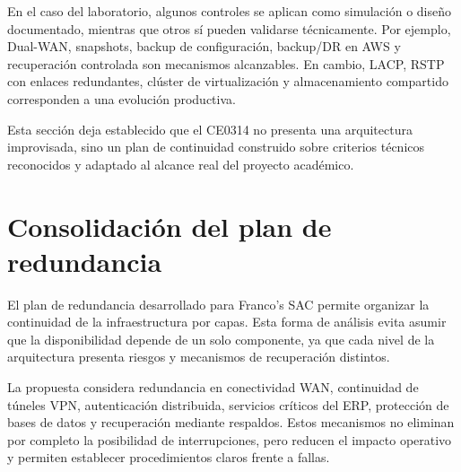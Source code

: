 \documentclass[11pt, a4paper, oneside]{report}
\begin{document}
En el caso del laboratorio, algunos controles se aplican como simulación o diseño documentado, mientras que otros sí pueden validarse técnicamente. Por ejemplo, Dual-WAN, snapshots, backup de configuración, backup/DR en AWS y recuperación controlada son mecanismos alcanzables. En cambio, LACP, RSTP con enlaces redundantes, clúster de virtualización y almacenamiento compartido corresponden a una evolución productiva.

Esta sección deja establecido que el CE0314 no presenta una arquitectura improvisada, sino un plan de continuidad construido sobre criterios técnicos reconocidos y adaptado al alcance real del proyecto académico.

\section{Consolidación del plan de redundancia}

El plan de redundancia desarrollado para Franco's SAC permite organizar la continuidad de la infraestructura por capas. Esta forma de análisis evita asumir que la disponibilidad depende de un solo componente, ya que cada nivel de la arquitectura presenta riesgos y mecanismos de recuperación distintos.

La propuesta considera redundancia en conectividad WAN, continuidad de túneles VPN, autenticación distribuida, servicios críticos del ERP, protección de bases de datos y recuperación mediante respaldos. Estos mecanismos no eliminan por completo la posibilidad de interrupciones, pero reducen el impacto operativo y permiten establecer procedimientos claros frente a fallas.

\renewcommand{\arraystretch}{1.3}
\footnotesize
{}
\end{document}
